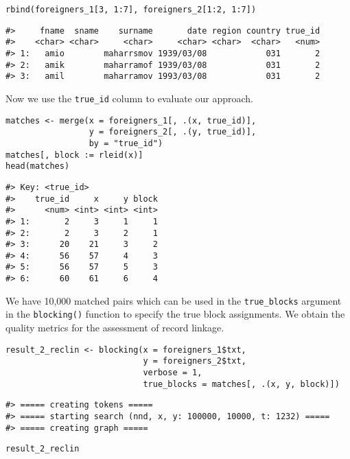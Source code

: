 \begin{verbatim}
rbind(foreigners_1[3, 1:7], foreigners_2[1:2, 1:7])
\end{verbatim}

\begin{verbatim}
#>     fname  sname    surname       date region country true_id
#>    <char> <char>     <char>     <char> <char>  <char>   <num>
#> 1:   amio        maharrsmov 1939/03/08            031       2
#> 2:   amik        maharramof 1939/03/08            031       2
#> 3:   amil        maharramov 1993/03/08            031       2
\end{verbatim}

Now we use the \texttt{true\_id} column to evaluate our approach.

\begin{verbatim}
matches <- merge(x = foreigners_1[, .(x, true_id)],
                 y = foreigners_2[, .(y, true_id)],
                 by = "true_id")
matches[, block := rleid(x)]
head(matches)
\end{verbatim}

\begin{verbatim}
#> Key: <true_id>
#>    true_id     x     y block
#>      <num> <int> <int> <int>
#> 1:       2     3     1     1
#> 2:       2     3     2     1
#> 3:      20    21     3     2
#> 4:      56    57     4     3
#> 5:      56    57     5     3
#> 6:      60    61     6     4
\end{verbatim}

We have 10,000 matched pairs which can be used in the \texttt{true\_blocks}
argument in the \texttt{blocking()} function to specify the true block
assignments. We obtain the quality metrics for the assessment of record
linkage.

\begin{verbatim}
result_2_reclin <- blocking(x = foreigners_1$txt,
                            y = foreigners_2$txt,
                            verbose = 1,
                            true_blocks = matches[, .(x, y, block)])
\end{verbatim}

\begin{verbatim}
#> ===== creating tokens =====
#> ===== starting search (nnd, x, y: 100000, 10000, t: 1232) =====
#> ===== creating graph =====
\end{verbatim}

\begin{verbatim}
result_2_reclin
\end{verbatim}

